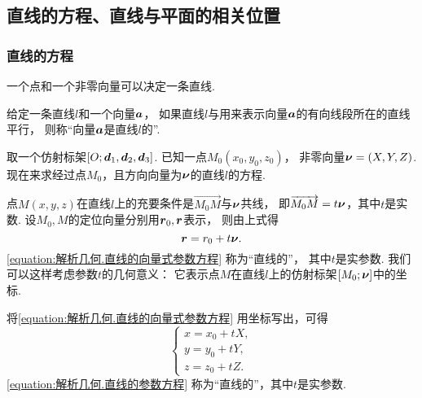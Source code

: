 \subsection{直线的方程、直线与平面的相关位置}

\subsubsection{直线的方程}
一个点和一个非零向量可以决定一条直线.

给定一条直线\(l\)和一个向量\(\boldsymbol{a}\)，
如果直线\(l\)与用来表示向量\(\boldsymbol{a}\)的有向线段所在的直线平行，
则称“向量\(\boldsymbol{a}\)是直线\(l\)的”.

取一个仿射标架\([O;\boldsymbol{d}_1,\boldsymbol{d}_2,\boldsymbol{d}_3]\).
已知一点\(M_0(x_0,y_0,z_0)\)，
非零向量\(\boldsymbol{\nu}=(X,Y,Z)\).
现在来求经过点\(M_0\)，且方向向量为\(\boldsymbol{\nu}\)的直线\(l\)的方程.

点\(M(x,y,z)\)在直线\(l\)上的充要条件是\(\vec{M_0 M}\)与\(\boldsymbol{\nu}\)共线，
即\(\overrightarrow{M_0 M} = t \boldsymbol{\nu}\)，其中\(t\)是实数.
设\(M_0,M\)的定位向量分别用\(\boldsymbol{r}_0,\boldsymbol{r}\)表示，
则由上式得
\begin{equation}\label{equation:解析几何.直线的向量式参数方程}
	\boldsymbol{r} = r_0 + t \boldsymbol{\nu}.
\end{equation}
\cref{equation:解析几何.直线的向量式参数方程} 称为“直线的”，
其中\(t\)是实参数.
我们可以这样考虑参数\(t\)的几何意义：
它表示点\(M\)在直线\(l\)上的仿射标架\([M_0;\boldsymbol{\nu}]\)中的坐标.

将\cref{equation:解析几何.直线的向量式参数方程} 用坐标写出，可得
\begin{equation}\label{equation:解析几何.直线的参数方程}
	\left\{ \begin{array}{l}
		x = x_0 + t X, \\
		y = y_0 + t Y, \\
		z = z_0 + t Z.
	\end{array} \right.
\end{equation}
\cref{equation:解析几何.直线的参数方程} 称为“直线的”，其中\(t\)是实参数.

